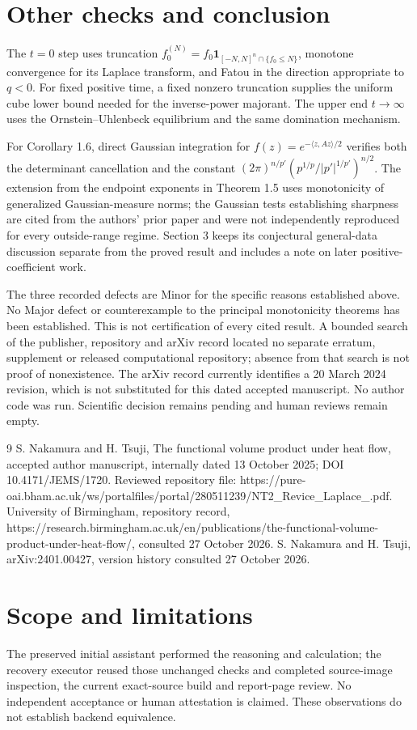 \documentclass[10pt]{article}
\begin{document}
\section*{Other checks and conclusion}
The \(t=0\) step uses truncation \(f_0^{(N)}=f_0\mathbf1_{[-N,N]^n\cap\{f_0\leq N\}}\), monotone convergence for its Laplace transform, and Fatou in the direction appropriate to \(q<0\). For fixed positive time, a fixed nonzero truncation supplies the uniform cube lower bound needed for the inverse-power majorant. The upper end \(t\to\infty\) uses the Ornstein–Uhlenbeck equilibrium and the same domination mechanism.\par
For Corollary 1.6, direct Gaussian integration for \(f(z)=e^{-\langle z,Az\rangle/2}\) verifies both the determinant cancellation and the constant \((2\pi)^{n/p'}(p^{1/p}/|p'|^{1/p'})^{n/2}\). The extension from the endpoint exponents in Theorem 1.5 uses monotonicity of generalized Gaussian-measure norms; the Gaussian tests establishing sharpness are cited from the authors’ prior paper and were not independently reproduced for every outside-range regime. Section 3 keeps its conjectural general-data discussion separate from the proved result and includes a note on later positive-coefficient work.\par
The three recorded defects are Minor for the specific reasons established above. No Major defect or counterexample to the principal monotonicity theorems has been established. This is not certification of every cited result. A bounded search of the publisher, repository and arXiv record located no separate erratum, supplement or released computational repository; absence from that search is not proof of nonexistence. The arXiv record currently identifies a 20 March 2024 revision, which is not substituted for this dated accepted manuscript. No author code was run. Scientific decision remains pending and human reviews remain empty.\par
9 S. Nakamura and H. Tsuji, The functional volume product under heat flow, accepted author manuscript, internally dated 13 October 2025; DOI 10.4171/JEMS/1720. Reviewed repository file: https://pure-oai.bham.ac.uk/ws/portalfiles/portal/280511239/NT2\_Revice\_Laplace\_.pdf. University of Birmingham, repository record, https://research.birmingham.ac.uk/en/publications/the-functional-volume-product-under-heat-flow/, consulted 27 October 2026. S. Nakamura and H. Tsuji, arXiv:2401.00427, version history consulted 27 October 2026.\par
\section*{Scope and limitations}
The preserved initial assistant performed the reasoning and calculation; the recovery executor reused those unchanged checks and completed source-image inspection, the current exact-source build and report-page review. No independent acceptance or human attestation is claimed. These observations do not establish backend equivalence.\par
\end{document}
